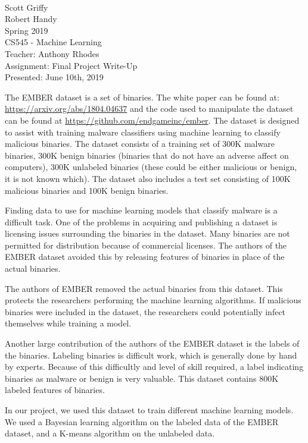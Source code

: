 \documentclass[12pt]{article}
\begin{document}
~\\
Scott Griffy \\
Robert Handy \\
Spring 2019 \\
CS545 - Machine Learning \\
Teacher: Anthony Rhodes \\
Assignment: Final Project Write-Up \\
Presented: June 10th, 2019 \\
\par
The EMBER dataset is a set of binaries.
The white paper can be found at: \url{https://arxiv.org/abs/1804.04637} and the code used to manipulate the dataset can be found at \url{https://github.com/endgameinc/ember}.
The dataset is designed to assist with training malware classifiers using machine learning to classify malicious binaries.
The dataset consists of a training set of 300K malware binaries, 300K benign binaries (binaries that do not have an adverse affect on computers), 300K unlabeled binaries (these could be either malicious or benign, it is not known which).
The dataset also includes a test set consisting of 100K malicious binaries and 100K benign binaries.
\par
Finding data to use for machine learning models that classify malware is a difficult task.
One of the problems in acquiring and publishing a dataset is licensing issues surrounding the binaries in the dataset.
Many binaries are not permitted for distribution because of commercial licenses.
The authors of the EMBER dataset avoided this by releasing features of binaries in place of the actual binaries.
\par
The authors of EMBER removed the actual binaries from this dataset.
This protects the researchers performing the machine learning algorithms.
If malicious binaries were included in the dataset, the researchers could potentially infect themselves while training a model.
\par
Another large contribution of the authors of the EMBER dataset is the labels of the binaries. Labeling binaries is difficult work, which is generally done by hand by experts. Because of this difficultly and level of skill required, a label indicating binaries as malware or benign is very valuable. This dataset contains 800K labeled features of binaries.
\par
In our project, we used this dataset to train different machine learning models.
We used a Bayesian learning algorithm on the labeled data of the EMBER dataset, and a K-means algorithm on the unlabeled data.
\end{document}
